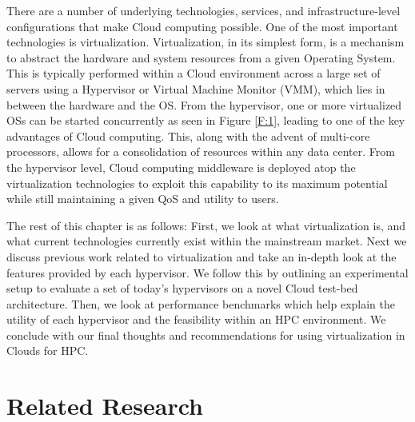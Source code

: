 There are a number of underlying technologies, services, and infrastructure-level configurations that make Cloud computing possible.  One of the most important technologies is virtualization. Virtualization, in its simplest form, is a mechanism to abstract the hardware and system resources from a given Operating System.  This is typically performed  within a Cloud environment across a large set of servers using a Hypervisor or Virtual Machine Monitor (VMM), which lies in between the hardware and the OS. From the hypervisor, one or more virtualized OSs can be started concurrently as seen in Figure \ref{F:1}, leading to one of the key advantages of Cloud computing.  This, along with the advent of multi-core processors, allows for a consolidation of resources within any data center.  From the hypervisor level, Cloud computing middleware is deployed atop the virtualization technologies to exploit this capability to its maximum potential while still maintaining a given QoS and utility to users.

\begin{comment}
 \FIGURE{htb}
  {images/VMM.pdf}
  {1.0}
  {Virtual Machine Abstraction}
  {F:blah}
\end{comment}

The rest of this chapter is as follows:  First, we look at what virtualization is, and what current technologies currently exist within the mainstream market. Next we discuss previous work related to virtualization and take an in-depth look at the features provided by each hypervisor.  We follow this by outlining an experimental setup to evaluate a set of today's hypervisors on a novel Cloud test-bed architecture. Then, we look at performance benchmarks which help explain the utility of each hypervisor and the feasibility within an HPC environment. We conclude with our final thoughts and recommendations for using virtualization in Clouds for HPC.   


\section{Related Research}

